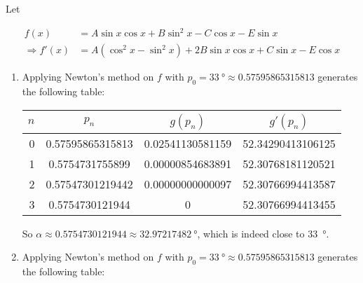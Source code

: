 \documentclass[../../../../Assignments]{subfiles}
\begin{document}
\begin{solution}
    Let

    \begin{align*}
                     f(x) &= A \sin{x} \cos{x} + B \sin^{2}{x} - C \cos{x} - E \sin{x} \\
        \Rightarrow f'(x) &= A (\cos^{2}{x} - \sin^{2}{x}) + 2 B \sin{x} \cos{x} + C \sin{x} - E \cos{x}
    \end{align*}

    \begin{enumerate}[label = \alph*)]
        \item Applying Newton's method on \(f\) with \(p_0 = \qty{33}{\degree}
            \approx \num{0.57595865315813}\) generates the following table:

            \begin{table}[H]
                \centering
                \begin{tabular}{r S[table-format=1.14] S[table-format=1.14] S[table-format=2.14]}
                    \toprule
                    \(n\)  &      {\(p_n\)}     &    {\(g(p_n)\)}    &    {\(g'(p_n)\)}    \\
                      &  0.57595865315813  &  0.02541130581159  &  52.34290413106125  \\
                        1  &  0.5754731755899   &  0.00000854683891  &  52.30768181120521  \\
                        2  &  0.57547301219442  &  0.00000000000097  &  52.30766994413587  \\
                        3  &  0.5754730121944   &  0                 &  52.30766994413455  \\
                    \bottomrule
                \end{tabular}
            \end{table}

            So \(\alpha \approx \num{0.5754730121944} \approx
            \qty{32.97217482}{\degree}\), which is indeed close to
            \qty{33}{\degree}.

        \item Applying Newton's method on \(f\) with \(p_0 = \qty{33}{\degree}
            \approx \num{0.57595865315813}\) generates the following table:


\end{enumerate}
\end{solution}
\end{document}
